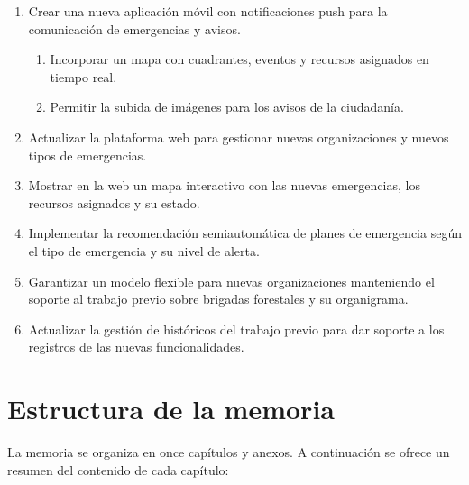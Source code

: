 \begin{enumerate}
    \item Crear una nueva aplicación móvil con notificaciones push para la comunicación de emergencias y avisos.
    \begin{enumerate}
        \item Incorporar un mapa con cuadrantes, eventos y recursos asignados en tiempo real.
        \item Permitir la subida de imágenes para los avisos de la ciudadanía.
    \end{enumerate}
    \item Actualizar la plataforma web para gestionar nuevas organizaciones y nuevos tipos de emergencias.
    \item Mostrar en la web un mapa interactivo con las nuevas emergencias, los recursos asignados y su estado.
    \item Implementar la recomendación semiautomática de planes de emergencia según el tipo de emergencia y su nivel de alerta.
    \item Garantizar un modelo flexible para nuevas organizaciones manteniendo el soporte al trabajo previo \cite{TFGAdrianGarcia2025} sobre brigadas forestales y su organigrama.
    \item Actualizar la gestión de históricos del trabajo previo \cite{TFGAdrianGarcia2025} para dar soporte a los registros de las nuevas funcionalidades.
\end{enumerate}

\section{Estructura de la memoria}
\label{sec:estructura}

La memoria se organiza en once capítulos y anexos. A continuación se ofrece un resumen del contenido de cada capítulo:

